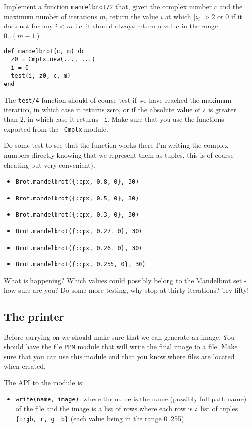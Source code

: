 \documentclass[a4paper,11pt]{article}
\begin{document}
Implement a function {\tt mandelbrot/2} that, given the complex number
$c$ and the maximum number of iterations $m$, return the value $i$ at
which $|z_i| > 2$ or $0$ if it does not for any $i < m$ i.e. it
should always return a value in the range $0..(m-1)$.

\begin{verbatim}
def mandelbrot(c, m) do
  z0 = Cmplx.new(..., ...)
  i = 0
  test(i, z0, c, m)
end
\end{verbatim}

The {\tt test/4} function should of course test if we have reached the
maximum iteration, in which case it returns zero, or if the absolute
value of {\tt z} is greater than $2$, in which case it returns {\tt
  i}. Make sure that you use the functions exported from the {\tt
  Cmplx} module.

Do some test to see that the function works (here I'm writing the
complex numbers directly knowing that we represent them as tuples,
this is of course cheating but very convenient).

\begin{itemize}
 \item {\tt Brot.mandelbrot(\{:cpx, 0.8, 0\}, 30)}
 \item {\tt Brot.mandelbrot(\{:cpx, 0.5, 0\}, 30)}
 \item {\tt Brot.mandelbrot(\{:cpx, 0.3, 0\}, 30)}
 \item {\tt Brot.mandelbrot(\{:cpx, 0.27, 0\}, 30)} 
 \item {\tt Brot.mandelbrot(\{:cpx, 0.26, 0\}, 30)}
 \item {\tt Brot.mandelbrot(\{:cpx, 0.255, 0\}, 30)}
\end{itemize}

What is happening? Which values could possibly belong to the
Mandelbrot set - how sure are you? Do some more testing, why stop at
thirty iterations? Try fifty!


\subsection{The printer}

Before carrying on we should make sure that we can generate an
image. You should have the file {\tt PPM} module that will write the
final image to a file. Make sure that you can use this module and that
you know where files are located when created.

The API to the module is:

\begin{itemize}
 \item {\tt write(name, image)}: where the name is the name (possibly
   full path name) of the file and the image is a list of rows where
   each row is a list of tuples {\tt \{:rgb, r, g, b\}} (each value being in
   the range 0..255).
\end{itemize}
\end{document}

